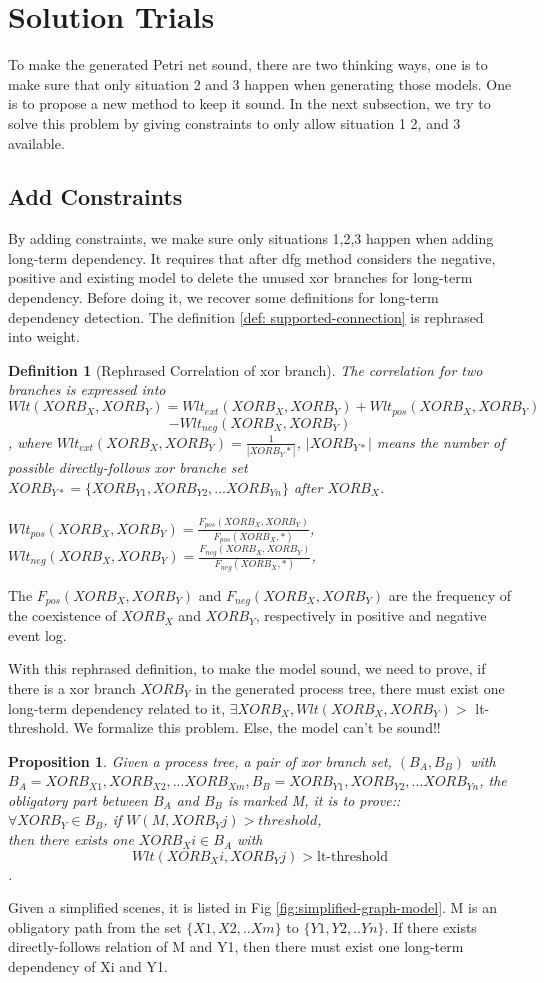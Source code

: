 \documentclass[]{article}
\newtheorem{mydef}{Definition}[section]
\newtheorem{myproposition}{Proposition}[section]
\begin{document}
\section{Solution Trials}
To make the generated Petri net sound, there are two thinking ways, one is to make sure that only situation 2 and 3 happen when generating those models. One is to propose a new method to keep it sound. 
In the next subsection, we try to solve this problem by giving constraints to only allow situation 1 2, and 3 available. 
\subsection{Add Constraints}
By adding constraints, we make sure only situations 1,2,3 happen when adding long-term dependency. It requires that after dfg method considers the negative, positive and existing model to delete the unused xor branches for long-term dependency. 
Before doing it, we recover some definitions for long-term dependency detection. 
The definition \ref{def: supported-connection} is rephrased into weight. 
\begin{mydef}[Rephrased Correlation of xor branch] The correlation for two branches is expressed into
	\[Wlt(XORB_X,XORB_Y)= Wlt_{ext}(XORB_X, XORB_Y) + Wlt_{pos}(XORB_X, XORB_Y)\] \[ -Wlt_{neg}(XORB_X, XORB_Y)\], where 
	$Wlt_{ext}(XORB_X, XORB_Y)= \frac{1}{|XORB_Y*|}$, $|XORB_{Y*}|$ means the number of possible  directly-follows xor branche set $XORB_{Y*}=\{XORB_{Y1}, XORB_{Y2},...XORB_{Yn} \}$ after $XORB_X$. \\ \\
	$Wlt_{pos}(XORB_X, XORB_Y)= \frac{F_{pos}(XORB_X, XORB_Y)}{F_{pos}(XORB_X, *)}$, \\
	$Wlt_{neg}(XORB_X, XORB_Y)= \frac{F_{neg}(XORB_X, XORB_Y)}{F_{neg}(XORB_X, *)}$, \\	
\end{mydef}
The $F_{pos}(XORB_X, XORB_Y)$ and $F_{neg}(XORB_X, XORB_Y)$ are the frequency of the coexistence of $XORB_X$ and $XORB_Y$, respectively in positive and negative event log.

With this rephrased definition, to make the model sound, we need to prove, if there is a xor branch $XORB_Y$ in the generated process tree, there must exist one long-term dependency related to it, $\exists XORB_X, Wlt(XORB_X,XORB_Y) >$ lt-threshold. We formalize this problem. Else, the model can't be sound!!
\begin{myproposition}
	Given a process tree, a pair of xor branch set, $(B_A,B_B)$ with $B_A={XORB_{X1}, XORB_{X2},...XORB_{Xm}}, B_B={XORB_{Y1}, XORB_{Y2},...XORB_{Yn}}$, the obligatory part between $B_A$ and $B_B$ is marked M, it is to prove:: \\
	$\forall XORB_Y \in B_B$, if $W(M, XORB_Yj) > threshold$, \\ then there exists one $XORB_Xi \in B_A$ with 
	\[Wlt(XORB_Xi, XORB_Yj)> \text{lt-threshold}\]. 
\end{myproposition}
Given a simplified scenes, it is listed in Fig \ref{fig:simplified-graph-model}. M is an obligatory path from the set $\{X1,X2,..Xm\}$ to $\{Y1,Y2,..Yn\}$. If there exists directly-follows relation of M and Y1, then there must exist one long-term dependency of Xi and Y1. 
\end{document}
